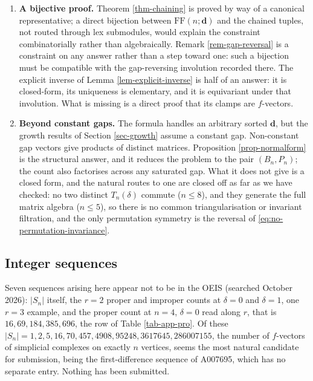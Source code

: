 \documentclass[11pt, a4paper, abstract=yes]{scrartcl}
\theoremstyle{definition}
\theoremstyle{remark}
\theoremstyle{plain}
\newcommand{\vek}[1]{\boldsymbol{#1}}
\begin{document}
\begin{enumerate}
\item \textbf{A bijective proof.} Theorem \ref{thm-chaining} is proved by way of a canonical representative;
a direct bijection between \(\mathrm{FF}(n;\vek d)\) and the chained tuples, not routed through lex
submodules, would explain the constraint combinatorially rather than algebraically. Remark
\ref{rem-gap-reversal} is a constraint on any answer rather than a step toward one: such a
bijection must be compatible with the gap-reversing involution recorded there. The explicit
inverse of Lemma \ref{lem-explicit-inverse} is half of an answer: it is closed-form, its
uniqueness is elementary, and it is equivariant under that involution. What is missing is a
direct proof that its clamps are \(f\)-vectors.
\item \textbf{Beyond constant gaps.} The formula handles an arbitrary sorted \(\vek d\), but the growth results of
Section \ref{sec-growth} assume a constant gap. Non-constant gap vectors give products of distinct
matrices. Proposition \ref{prop-normalform} is the structural answer, and it reduces the problem
to the pair \((B_n,P_n)\); the count also factorises across any saturated gap. What it does not give
is a closed form, and the natural routes to one are closed off as far as we have checked: no two
distinct \(T_n(\delta)\) commute (\(n\le8\)), and they generate the full matrix algebra
(\(n\le5\)), so there is no common triangularisation or invariant filtration, and the only permutation symmetry is the reversal of
\eqref{eq:no-permutation-invariance}.
\end{enumerate}
\subsection{Integer sequences}
\label{sec:orge5e0547}

Seven sequences arising here appear not to be in the OEIS (searched October 2026): \(|S_n|\) itself, the \(r=2\)
proper and improper counts at \(\delta=0\) and \(\delta=1\), one \(r=3\) example, and the proper
count at \(n=4\), \(\delta=0\) read along \(r\), that is \(16,69,184,385,696\), the row of
Table \ref{tab-app-pro}. Of
these \(|S_n|=1,2,5,16,70,457,4908,95248,3617645,286007155\), the number of \(f\)-vectors of
simplicial complexes on exactly \(n\) vertices, seems the most natural candidate for submission,
being the first-difference sequence of A007695, which has no separate entry. Nothing has been
submitted.

\appendix
\end{document}
